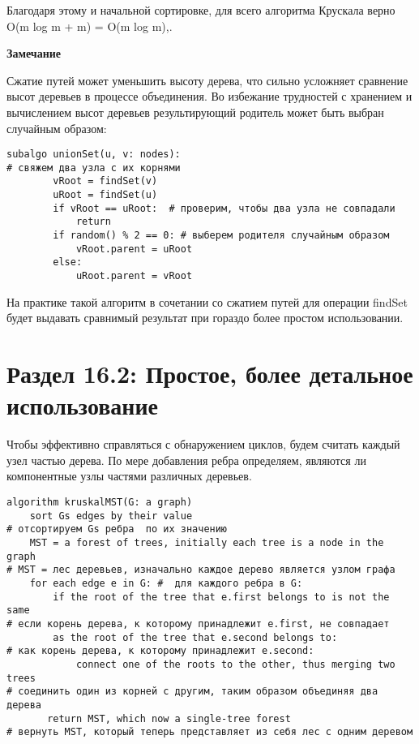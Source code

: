 \vspace{\baselineskip}
Благодаря этому и начальной сортировке, для всего алгоритма Крускала верно O(m log m + m) = O(m log m),. 

\vspace{\baselineskip}
\textbf{Замечание}

\vspace{\baselineskip}
Сжатие путей может уменьшить высоту дерева, что сильно усложняет сравнение высот деревьев в процессе объединения. Во избежание трудностей с хранением и вычислением высот деревьев результирующий родитель может быть выбран случайным образом: 

\vspace{\baselineskip}
\begin{tcolorbox}
\begin{verbatim}
subalgo unionSet(u, v: nodes):
# свяжем два узла с их корнями
        vRoot = findSet(v)
        uRoot = findSet(u)
        if vRoot == uRoot:  # проверим, чтобы два узла не совпадали
            return
        if random() % 2 == 0: # выберем родителя случайным образом
            vRoot.parent = uRoot
        else:
            uRoot.parent = vRoot
\end{verbatim}
\end{tcolorbox}

\vspace{\baselineskip}
На практике такой алгоритм в сочетании со сжатием путей для операции findSet будет выдавать сравнимый результат при гораздо более простом использовании. 

\vspace{\baselineskip}
\section*{Раздел 16.2: Простое, более детальное использование}

\vspace{\baselineskip}
Чтобы эффективно справляться с обнаружением циклов, будем считать каждый узел частью дерева. По мере добавления ребра определяем, являются ли компонентные узлы частями различных деревьев.

\vspace{\baselineskip}
\begin{tcolorbox}
\begin{verbatim}
algorithm kruskalMST(G: a graph)
    sort Gs edges by their value 
# отсортируем Gs ребра  по их значению
    MST = a forest of trees, initially each tree is a node in the graph 
# MST = лес деревьев, изначально каждое дерево является узлом графа
    for each edge e in G: #  для каждого ребра в G:
        if the root of the tree that e.first belongs to is not the same
# если корень дерева, к которому принадлежит e.first, не совпадает
        as the root of the tree that e.second belongs to: 
# как корень дерева, к которому принадлежит e.second:
            connect one of the roots to the other, thus merging two trees
# соединить один из корней с другим, таким образом объединяя два дерева
       return MST, which now a single-tree forest
# вернуть MST, который теперь представляет из себя лес с одним деревом
\end{verbatim}
\end{tcolorbox}

